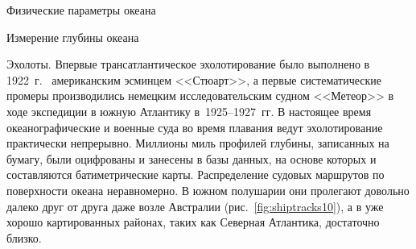 \begin{chapter}{Физические параметры океана}
\begin{section}{Измерение глубины океана}
\begin{paragraph}{Эхолоты.}
Впервые трансатлантическое эхолотирование было выполнено в 1922~г.\ %
американским эсминцем <<Стюарт>>, 
а первые систематические промеры производились немецким
исследовательским судном <<Метеор>> в ходе экспедиции в южную
Атлантику в~1925--1927~гг. В настоящее время океанографические и военные суда
во время плавания ведут эхолотирование практически непрерывно.
Миллионы миль профилей глубины, записанных на бумагу,
были оцифрованы и занесены в базы данных, на основе которых и
составляются батиметрические карты. Распределение судовых маршрутов по
поверхности океана неравномерно. В южном полушарии они пролегают
довольно далеко друг от друга даже возле Австралии 
(рис.~\ref{fig:shiptracks10}), а в уже хорошо картированных районах, 
таких как Северная Атлантика, достаточно близко.
%


\end{paragraph}
\end{section}
\end{chapter}
